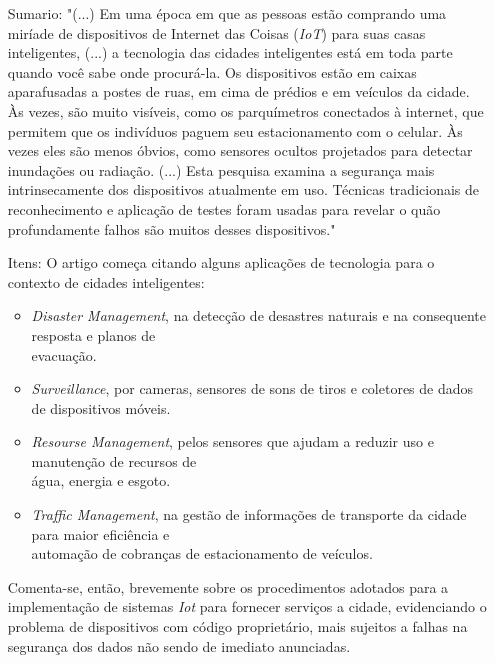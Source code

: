 \documentclass[letterpaper,11pt]{texMemo} %
\begin{document}
\maketitle %


\begin{itemize}
	\item[Sumario:] "(...) Em uma época em que as pessoas estão comprando uma miríade de dispositivos de Internet das Coisas (\textit{IoT}) para suas casas inteligentes, (...) a tecnologia das cidades inteligentes está em toda parte quando você sabe onde procurá-la. Os dispositivos estão em caixas aparafusadas a postes de ruas, em cima de prédios e em veículos da cidade. Às vezes, são muito visíveis, como os parquímetros conectados à internet, que permitem que os indivíduos paguem seu estacionamento com o celular. Às vezes eles são menos óbvios, como sensores ocultos projetados para detectar inundações ou radiação. (...) Esta pesquisa examina a segurança mais intrinsecamente dos dispositivos atualmente em uso. Técnicas tradicionais de reconhecimento e aplicação de testes foram usadas para revelar o quão profundamente falhos são muitos desses dispositivos."
	\item[Itens:] O artigo começa citando alguns aplicações de tecnologia para o contexto de cidades inteligentes:
	\begin{itemize}
		\item \textit{Disaster Management}, na detecção de desastres naturais e na consequente resposta e planos de \\
		evacuação.
		\item \textit{Surveillance}, por cameras, sensores de sons de tiros e coletores de dados de dispositivos móveis.
		\item \textit{Resourse Management}, pelos sensores que ajudam a reduzir uso e manutenção de recursos de \\
		água, energia e esgoto.
		\item \textit{Traffic Management}, na gestão de informações de transporte da cidade para maior eficiência e \\
		automação de cobranças de estacionamento de veículos. 
	\end{itemize}
	Comenta-se, então, brevemente sobre os procedimentos adotados para a implementação de sistemas \textit{Iot} para fornecer serviços a cidade, evidenciando o problema de dispositivos com código proprietário, mais sujeitos a falhas na segurança dos dados não sendo de imediato anunciadas.\\

\end{itemize}
\end{document}
